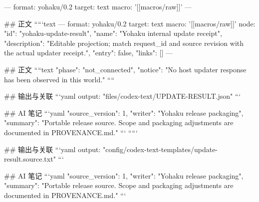 ---
format: yohaku/0.2
target: text
macro: '[[macros/raw]]'
---

## 正文
`````text
---
format: yohaku/0.2
target: text
macro: '[[macros/raw]]'
node: {"id": "yohaku-update-result", "name": "Yohaku internal update receipt", "description": "Editable projection; match request_id and source revision with the actual updater receipt.", "entry": false, "links": []}
---

## 正文
````text
{
  "phase": "not_connected",
  "notice": "No host updater response has been observed in this world."
}
````

## 输出与关联
```yaml
output: "files/codex-text/UPDATE-RESULT.json"
```

## AI 笔记
```yaml
{"source_version": 1, "writer": "Yohaku release packaging", "summary": "Portable release source. Scope and packaging adjustments are documented in PROVENANCE.md."}
```
`````

## 输出与关联
```yaml
output: "config/codex-text-templates/update-result.source.txt"
```

## AI 笔记
```yaml
{"source_version": 1, "writer": "Yohaku release packaging", "summary": "Portable release source. Scope and packaging adjustments are documented in PROVENANCE.md."}
```
